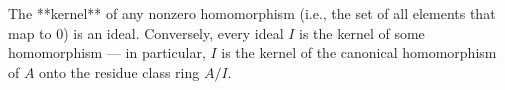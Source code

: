 The **kernel** of any nonzero homomorphism (i.e., the set of all elements that map to $0$) is an ideal. Conversely, every ideal $I$ is the kernel of some homomorphism — in particular, $I$ is the kernel of the canonical homomorphism of $A$ onto the residue class ring $A/I$.
